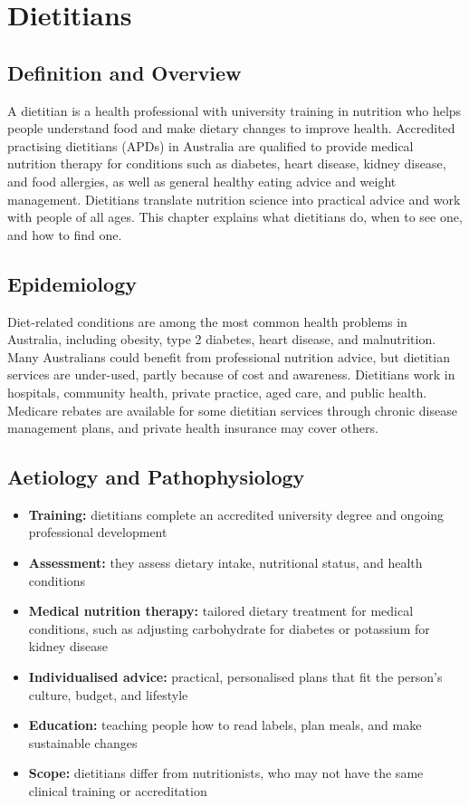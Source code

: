 \chapter{Dietitians}

\section*{Definition and Overview}
A dietitian is a health professional with university training in nutrition who helps people understand food and make dietary changes to improve health. Accredited practising dietitians (APDs) in Australia are qualified to provide medical nutrition therapy for conditions such as diabetes, heart disease, kidney disease, and food allergies, as well as general healthy eating advice and weight management. Dietitians translate nutrition science into practical advice and work with people of all ages. This chapter explains what dietitians do, when to see one, and how to find one.

\section*{Epidemiology}
Diet-related conditions are among the most common health problems in Australia, including obesity, type 2 diabetes, heart disease, and malnutrition. Many Australians could benefit from professional nutrition advice, but dietitian services are under-used, partly because of cost and awareness. Dietitians work in hospitals, community health, private practice, aged care, and public health. Medicare rebates are available for some dietitian services through chronic disease management plans, and private health insurance may cover others.

\section*{Aetiology and Pathophysiology}
\begin{itemize}
    \item \textbf{Training:} dietitians complete an accredited university degree and ongoing professional development
    \item \textbf{Assessment:} they assess dietary intake, nutritional status, and health conditions
    \item \textbf{Medical nutrition therapy:} tailored dietary treatment for medical conditions, such as adjusting carbohydrate for diabetes or potassium for kidney disease
    \item \textbf{Individualised advice:} practical, personalised plans that fit the person's culture, budget, and lifestyle
    \item \textbf{Education:} teaching people how to read labels, plan meals, and make sustainable changes
    \item \textbf{Scope:} dietitians differ from nutritionists, who may not have the same clinical training or accreditation
\end{itemize}

